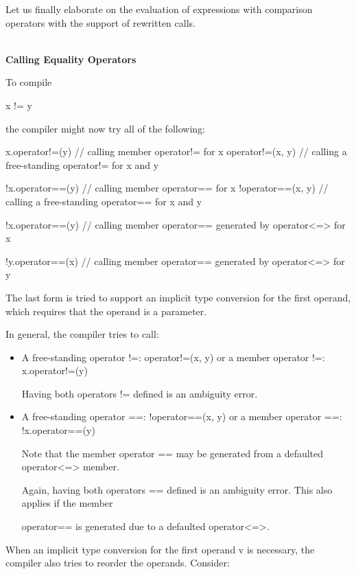 Let us finally elaborate on the evaluation of expressions with comparison operators with the support of rewritten calls.


\noindent
\hspace*{\fill} \\ %
\textbf{Calling Equality Operators}

To compile

\begin{cpp}
x != y
\end{cpp}

the compiler might now try all of the following:

\begin{cpp}
x.operator!=(y) // calling member operator!= for x
operator!=(x, y) // calling a free-standing operator!= for x and y

!x.operator==(y) // calling member operator== for x
!operator==(x, y) // calling a free-standing operator== for x and y

!x.operator==(y) // calling member operator== generated by operator<=> for x

!y.operator==(x) // calling member operator== generated by operator<=> for y
\end{cpp}

The last form is tried to support an implicit type conversion for the first operand, which requires that the operand is a parameter.

In general, the compiler tries to call:

\begin{itemize}
\item
A free-standing operator !=: operator!=(x, y) or a member operator !=: x.operator!=(y)

Having both operators != defined is an ambiguity error.

\item
A free-standing operator ==: !operator==(x, y) or a member operator ==: !x.operator==(y)

Note that the member operator == may be generated from a defaulted operator<=> member.

Again, having both operators == defined is an ambiguity error. This also applies if the member

operator== is generated due to a defaulted operator<=>.
\end{itemize}

When an implicit type conversion for the first operand v is necessary, the compiler also tries to reorder the operands. Consider:

